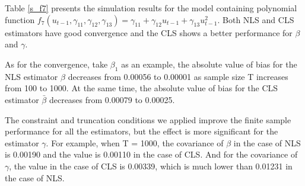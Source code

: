 \documentclass[a4paper,12pt,times,numbered,print,index]{report}
\numberwithin{equation}{section}
\begin{document}
Table \ref{s_f7} presents the simulation results for the model containing polynomial function $f_{7}\left( u_{t-1},\gamma_{11}, \gamma_{12}, \gamma_{13}\right) = \gamma_{11}+ \gamma_{12}u_{t-1}+\gamma_{13}u_{t-1}^{2}$. Both NLS and CLS estimators have good convergence and the CLS shows a better performance for $\beta$ and $\gamma$. 

As for the convergence, take $\beta_{1}$ as an example, the absolute value of bias for the NLS estimator $\hat{\beta}$ decreases from 0.00056 to 0.00001 as sample size T increases from 100 to 1000. At the same time, the absolute value of bias for the CLS estimator $\bar{\beta}$ decreases from 0.00079 to 0.00025. 

The constraint and truncation conditions we applied improve the finite sample performance for all the estimators, but the effect is more significant for the estimator $\gamma$. For example, when T = 1000, the covariance of $\beta$ in the case of NLS is 0.00190 and the value is 0.00110 in the case of CLS. And for the covariance of $\gamma$, the value in the case of CLS is 0.00339, which is much lower than 0.01231 in the case of NLS.
\end{document}
